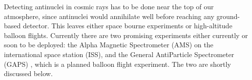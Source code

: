 Detecting antinuclei in cosmic rays has to be done near the top of our atmosphere, since antinuclei would annihilate well before reaching any ground-based detector. This leaves either space bourne experiments or high-altitude balloon flights. Currently there are two promising experiments either currently or soon to be deployed: the Alpha Magnetic Spectrometer (AMS) \cite{AMS2015} on the international space station (ISS), and the General AntiParticle Spectrometer (GAPS) \cite{GAPS_setup_Bird, GAPS_method_Vanuccini}, which is a planned balloon flight experiment. The two are shortly discussed below.\\

